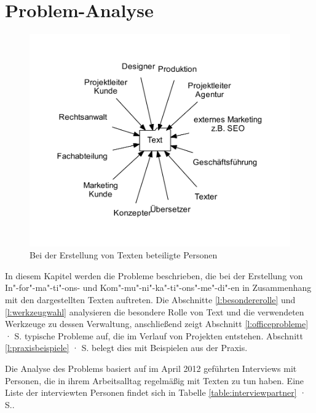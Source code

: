 \section{Problem-Analyse}\label{l:problemanalyse}

\begin{figure}[htb]
\begin{center}
\includegraphics[width=\textwidth]{media/chart-2.pdf}
\end{center}
\caption{Bei der Erstellung von Texten beteiligte Personen}
\label{chart:2}
\end{figure}

In diesem Kapitel werden die Probleme beschrieben, die bei der Erstellung von In"-for"-ma"-ti"-ons- und Kom"-mu"-ni"-ka"-ti"-ons"-me"-di"-en in Zusammenhang mit den dargestellten Texten auftreten. Die Abschnitte \ref{l:besondererolle} und \ref{l:werkzeugwahl} analysieren die besondere Rolle von Text und die verwendeten Werkzeuge zu dessen Verwaltung, anschließend zeigt Abschnitt \ref{l:officeprobleme} · S.\pageref{l:officeprobleme} typische Probleme auf, die im Verlauf von Projekten entstehen. Abschnitt \ref{l:praxisbeispiele} · S.\pageref{l:praxisbeispiele} belegt dies mit Beispielen aus der Praxis. 

\bigskip

Die Analyse des Problems basiert auf im April 2012 geführten Interviews mit Personen, die in ihrem Arbeitsalltag regelmäßig mit Texten zu tun haben. Eine Liste der interviewten Personen findet sich in Tabelle \ref{table:interviewpartner} · S.\pageref{table:interviewpartner}.

